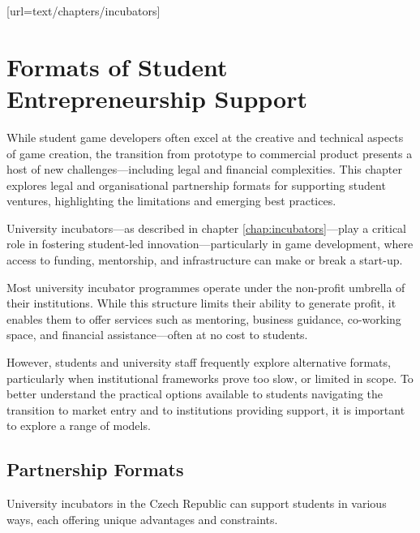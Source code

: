 [url=text/chapters/incubators]
\chapter{Formats of Student Entrepreneurship Support}\label{chap:support-formats}

\begin{chapterabstract}
    While student game developers often excel at the creative and technical aspects of game creation, the transition from prototype to commercial product presents a host of new challenges---including legal and financial complexities. This chapter explores legal and organisational partnership formats for supporting student ventures, highlighting the limitations and emerging best practices.
\end{chapterabstract}

University incubators—as described in chapter \ref{chap:incubators}---play a critical role in fostering student-led innovation---particularly in game development, where access to funding, mentorship, and infrastructure can make or break a start-up.

Most university incubator programmes operate under the non-profit umbrella of their institutions. While this structure limits their ability to generate profit, it enables them to offer services such as mentoring, business guidance, co-working space, and financial assistance---often at no cost to students.
\cite{uni-game-incubation, isis-innovation}

However, students and university staff frequently explore alternative formats, particularly when institutional frameworks prove too slow, or limited in scope. To better understand the practical options available to students navigating the transition to market entry and to institutions providing support, it is important to explore a range of models.
\cite{uni-game-incubation, isis-innovation}

\section{Partnership Formats}\label{sec:partnership-formats}
University incubators in the Czech Republic can support students in various ways, each offering unique advantages and constraints.

